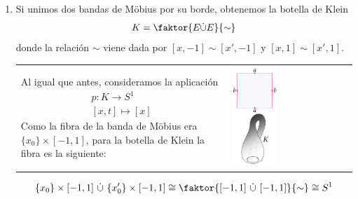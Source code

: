 \begin{enumerate}
\begin{enumerate}
\item Si unimos dos bandas de Möbius por su borde, obtenemos la botella de Klein 
\[
K = \faktor{E \dot{\cup} E}{\sim} 
\]
donde la relación $\sim$ viene dada por $[x, -1] \sim [x', -1]$ y $[x, 1] \sim [x', 1]$. \par
\begin{tabular}{ll}
	\begin{minipage}{0.4\textwidth}
	Al igual que antes, consideramos la aplicación 
		\begin{align*}
			p : K \longrightarrow S^1\\
			[x,t] \longmapsto [x]
		\end{align*}
	Como la fibra de la banda de Möbius era $\{x_0\} \times [-1, 1]$, para la botella de Klein la fibra es la siguiente:
	\end{minipage}
		&
	\begin{minipage}{0.5\textwidth}
		\centering
		\includegraphics[width = 0.4\textwidth]{images/klein}
	\end{minipage}
\end{tabular}

\[
\{x_0\} \times [-1, 1] \ \dot{\cup} \ \{x_0'\} \times [-1, 1] \cong \faktor{[-1, 1] \ \dot{\cup} \ [-1,1]}{\sim} \cong S^1
\]


\end{enumerate}
\end{enumerate}
